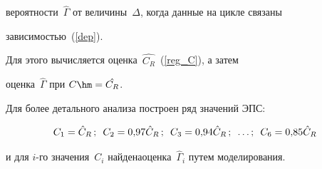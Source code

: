 вероятности~$\hat{\Gamma}$ от  величины~$\Delta$, когда данные на цикле связаны  


зависимостью~(\ref{dep}).


 Для этого вычисляется  оценка~$\hat{C_R}$~(\ref{reg_C}), а затем  


 оценка~$\hat{\Gamma}$ при    $C\hm=\hat{C_R}$.


 Для более детального анализа  построен  ряд значений ЭПС:


$$


C_1=\hat C_R\,;\enskip


C_2=0{,}97 \hat C_R\,;\enskip


C_3=0{,}94\hat C_R\,;\enskip \ldots ;\enskip 


C_{6}=0{,}85\hat C_R


$$















\noindent


и для $i$-го  значения~$C_i$ найдена\linebreak    оценка~$\hat{\Gamma}_i$ путем  моделирования.



